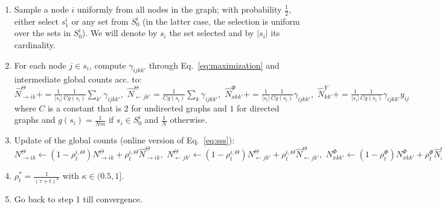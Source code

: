 \begin{enumerate}
\item Sample a node $i$ uniformly from all nodes in the graph; with probability $\frac{1}{2}$, either select $s_1^i$ or any set from $S_0^i$ (in the latter case, the selection is uniform over the sets in $S_0^i$). We will denote by $s_i$ the set selected and by $|s_i|$ its cardinality.
\item For each node $j \in s_i$, compute $\gamma_{ijkk'}$ through Eq.~\ref{eq:maximization} and intermediate global counts acc. to: {\small
$\hat N^{\Theta}_{\rightarrow ik} += \frac{1}{|s_i|} \frac{1}{Cg(s_i)} \sum_{k'} \gamma_{ijkk'}, \,\, \hat N^{\Theta}_{\leftarrow jk'} = \frac{1}{Cg(s_i)} \sum_{k} \gamma_{ijkk'}, \,\, \hat N^{\Phi}_{xkk'} += \frac{1}{|s_i|} \frac{1}{Cg(s_i)} \gamma_{ijkk'}, \,\, \hat N^{Y}_{kk'} += \frac{1}{|s_i|} \frac{1}{Cg(s_i)} \gamma_{ijkk'} y_{ij}$
}\\
where $C$ is a constant that is $2$ for undirected graphs and $1$ for directed graphs and $g(s_i) = \frac{1}{Nm}$ if $s_i \in S_0^i$ and $\frac{1}{N}$ otherwise.
\item Update of the global counts (online version of Eq.~\ref{eq:sss}): {\small $N^{\Theta}_{\rightarrow ik} \leftarrow (1 - \rho^{i,\Theta}_t) N^{\Theta}_{\rightarrow ik} + \rho^{i,\Theta}_t \hat N^{\Theta}_{\rightarrow ik}, \,\, N^{\Theta}_{\leftarrow jk'} \leftarrow (1 - \rho^{i,\Theta}_t) N^{\Theta}_{\leftarrow jk'} + \rho^{i,\Theta}_t \hat N^{\Theta}_{\leftarrow jk'}, \,\, N^{\Phi}_{xkk'} \leftarrow (1 - \rho^{\Phi}_t) N^{\Phi}_{xkk'} + \rho^{\Phi}_t \hat N^{\Phi}_{xkk'}, \,\, N^{Y}_{kk'} \leftarrow (1 - \rho^{Y}_t) N^{Y}_{kk'} + \rho^{Y}_t \hat N^{Y}_{kk'}$}
\item $\rho^*_t = \frac{1}{(\tau +t)^\kappa}$ with $\kappa \in (0.5, 1]$.
\item Go back to step 1 till convergence.
\end{enumerate}
